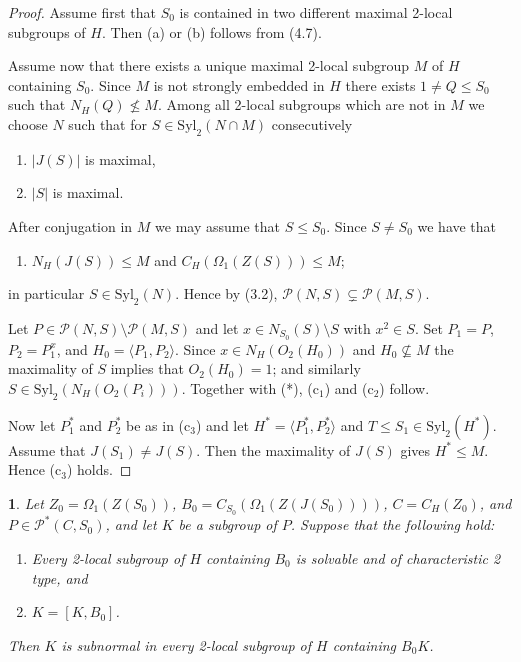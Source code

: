 \documentclass[11pt]{article}
\theoremstyle{plain}
\theoremstyle{stmplain}
\newtheorem{stm}{}[section]
\begin{document}
\begin{proof}
Assume first that $S_0$ is contained in two different maximal 2-local subgroups
of $H$. Then (a) or (b) follows from (4.7).

\smallskip
\noindent Assume now that there exists a unique maximal 2-local subgroup $M$ of $H$
containing $S_0$. Since $M$ is not strongly embedded in $H$ there exists
$1 \ne Q \le S_0$ such that $N_H(Q) \nleq M$. Among all 2-local subgroups which
are not in $M$ we choose $N$ such that for $S \in \mathrm{Syl}_2(N \cap M)$
consecutively
\begin{enumerate}
\item[(i)] $|J(S)|$ is maximal,
\item[(ii)] $|S|$ is maximal.
\end{enumerate}
After conjugation in $M$ we may assume that $S \le S_0$. Since $S \ne S_0$ we
have that
\begin{enumerate}
\item[(*)] $N_H(J(S)) \le M$ and $C_H(\Omega_1(Z(S))) \le M$;
\end{enumerate}
in particular $S \in \mathrm{Syl}_2(N)$. Hence by (3.2), $\mathcal{P}(N, S)
\subsetneq \mathcal{P}(M, S)$.

\smallskip
\noindent Let $P \in \mathcal{P}(N, S) \setminus \mathcal{P}(M, S)$ and let $x \in
N_{S_0}(S) \setminus S$ with $x^2 \in S$. Set $P_1 = P$, $P_2 = P_1^x$, and
$H_0 = \langle P_1, P_2 \rangle$. Since $x \in N_H(O_2(H_0))$ and $H_0
\nsubseteq M$ the maximality of $S$ implies that $O_2(H_0) = 1$; and similarly
$S \in \mathrm{Syl}_2(N_H(O_2(P_i)))$. Together with (*), (c$_1$) and (c$_2$)
follow.

\smallskip
\noindent Now let $P_1^*$ and $P_2^*$ be as in (c$_3$) and let $H^* = \langle P_1^*,
P_2^* \rangle$ and $T \le S_1 \in \mathrm{Syl}_2(H^*)$. Assume that $J(S_1) \ne
J(S)$. Then the maximality of $J(S)$ gives $H^* \le M$. Hence (c$_3$) holds.
\end{proof}

\begin{stm}\label{st:5.2}
Let $Z_0 = \Omega_1(Z(S_0))$, $B_0 = C_{S_0}(\Omega_1(Z(J(S_0))))$, $C =
C_H(Z_0)$, and $P \in \mathcal{P}^*(C, S_0)$, and let $K$ be a subgroup of
$P$. Suppose that the following hold:
\begin{enumerate}
\item[(i)] Every 2-local subgroup of $H$ containing $B_0$ is solvable and of
  characteristic 2 type, and
\item[(ii)] $K = [K, B_0]$.
\end{enumerate}
Then $K$ is subnormal in every 2-local subgroup of $H$ containing $B_0K$.
\end{stm}
\end{document}
